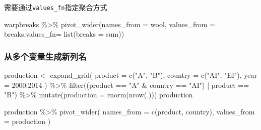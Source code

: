 \documentclass[
]{book}
\newenvironment{Shaded}{\begin{snugshade}}{\end{snugshade}}
\newcommand{\AttributeTok}[1]{\textcolor[rgb]{0.77,0.63,0.00}{#1}}
\newcommand{\DecValTok}[1]{\textcolor[rgb]{0.00,0.00,0.81}{#1}}
\newcommand{\FunctionTok}[1]{\textcolor[rgb]{0.00,0.00,0.00}{#1}}
\newcommand{\NormalTok}[1]{#1}
\newcommand{\OtherTok}[1]{\textcolor[rgb]{0.56,0.35,0.01}{#1}}
\newcommand{\SpecialCharTok}[1]{\textcolor[rgb]{0.00,0.00,0.00}{#1}}
\newcommand{\StringTok}[1]{\textcolor[rgb]{0.31,0.60,0.02}{#1}}
\begin{document}
需要通过\texttt{values\_fn}指定聚合方式

\begin{Shaded}
\begin{Highlighting}[]
\NormalTok{warpbreaks }\SpecialCharTok{\%\textgreater{}\%} \FunctionTok{pivot\_wider}\NormalTok{(}\AttributeTok{names\_from =}\NormalTok{ wool, }\AttributeTok{values\_from =}\NormalTok{ breaks,}\AttributeTok{values\_fn=} \FunctionTok{list}\NormalTok{(}\AttributeTok{breaks =}\NormalTok{ sum))}
\end{Highlighting}
\end{Shaded}

\hypertarget{ux4eceux591aux4e2aux53d8ux91cfux751fux6210ux65b0ux5217ux540d}{%
\subsubsection{从多个变量生成新列名}\label{ux4eceux591aux4e2aux53d8ux91cfux751fux6210ux65b0ux5217ux540d}}

\begin{Shaded}
\begin{Highlighting}[]
\NormalTok{production }\OtherTok{\textless{}{-}} \FunctionTok{expand\_grid}\NormalTok{(}
    \AttributeTok{product =} \FunctionTok{c}\NormalTok{(}\StringTok{"A"}\NormalTok{, }\StringTok{"B"}\NormalTok{), }
    \AttributeTok{country =} \FunctionTok{c}\NormalTok{(}\StringTok{"AI"}\NormalTok{, }\StringTok{"EI"}\NormalTok{), }
    \AttributeTok{year =} \DecValTok{2000}\SpecialCharTok{:}\DecValTok{2014}
\NormalTok{  ) }\SpecialCharTok{\%\textgreater{}\%}
  \FunctionTok{filter}\NormalTok{((product }\SpecialCharTok{==} \StringTok{"A"} \SpecialCharTok{\&}\NormalTok{ country }\SpecialCharTok{==} \StringTok{"AI"}\NormalTok{) }\SpecialCharTok{|}\NormalTok{ product }\SpecialCharTok{==} \StringTok{"B"}\NormalTok{) }\SpecialCharTok{\%\textgreater{}\%} 
  \FunctionTok{mutate}\NormalTok{(}\AttributeTok{production =} \FunctionTok{rnorm}\NormalTok{(}\FunctionTok{nrow}\NormalTok{(.)))}
\NormalTok{production}
\end{Highlighting}
\end{Shaded}

\begin{Shaded}
\begin{Highlighting}[]
\NormalTok{production }\SpecialCharTok{\%\textgreater{}\%} \FunctionTok{pivot\_wider}\NormalTok{(}
  \AttributeTok{names\_from =} \FunctionTok{c}\NormalTok{(product, country), }
  \AttributeTok{values\_from =}\NormalTok{ production}
\NormalTok{)}
\end{Highlighting}
\end{Shaded}
\end{document}
